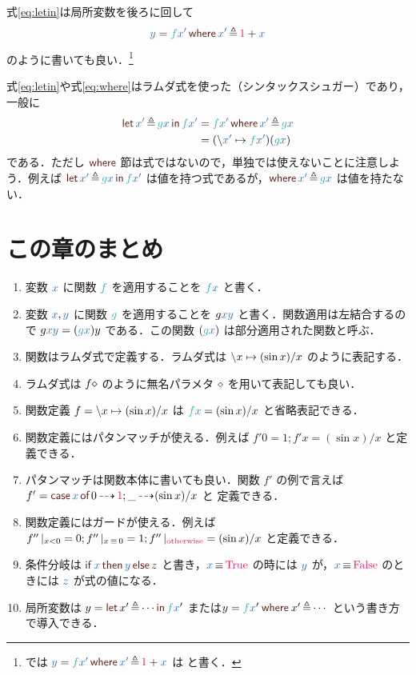\documentclass[a5paper,twoside,fleqn,draft]{jsbook}
\begin{document}
式\eqref{eq:letin}は局所変数を後ろに回して
\begin{equation}
  \label{eq:where}
  \hVar{y}
  =\hWhereSyntax{\hFunc{f}\hVar{x'}}{\hVar{x'}\hLetEq\hConstant{1}+\hVar{x}}
\end{equation}
のように書いても良い．\footnote{\haskell では $\hVar{y}=\hWhereSyntax{\hFunc{f}\hVar{x'}}{\hVar{x'}\hLetEq\hConstant{1}+\hVar{x}}$ は  と書く．}

式\eqref{eq:letin}や式\eqref{eq:where}はラムダ式を使った（シンタックスシュガー）であり，一般に
\begin{align}
  \hLetSyntax{\hVar{x'}\hLetEq\hFunc{g}\hVar{x}}{\hFunc{f}\hVar{x'}}
  &=\hWhereSyntax{\hFunc{f}\hVar{x'}}{\hVar{x'}\hLetEq\hFunc{g}\hVar{x}}\\
  &=(\hLambdaSyntax{\hVar{x'}}{\hFunc{f}\hVar{x'}})(\hFunc{g}\hVar{x})
\end{align}
である．ただし $\hWhere$ 節は式ではないので，単独では使えないことに注意しよう．例えば $\hLetSyntax{\hVar{x'}\hLetEq\hFunc{g}\hVar{x}}{\hFunc{f}\hVar{x'}}$ は値を持つ式であるが，$\hWhereSyntax{}{\hVar{x'}\hLetEq\hFunc{g}\hVar{x}}$ は値を持たない．

\section{この章のまとめ}

\begin{enumerate}
\item 変数 $\hVar{x}$ に関数 $\hFunc{f}$ を適用することを $\hFunc{f}\hVar{x}$ と書く．\item 変数 $\hVar{x},\hVar{y}$ に関数 $\hFunc{g}$ を適用することを $g\hVar{x}\hVar{y}$ と書く．関数適用は左結合するので $g\hVar{x}\hVar{y}=(\hFunc{g}\hVar{x})y$ である．この関数 $(\hFunc{g}\hVar{x})$ は部分適用された関数と呼ぶ．
\item 関数はラムダ式で定義する．ラムダ式は $\backslash x\mapsto(\sin x)/x$ のように表記する．\item ラムダ式は $f\diamond$ のように無名パラメタ $\diamond$ を用いて表記しても良い．\item 関数定義 $f=\backslash x\mapsto(\sin x)/x$ は $\hFunc{f}\hVar{x}=(\sin x)/x$ と省略表記できる．
\item 関数定義にはパタンマッチが使える．例えば $f'0=1;f'x=(\sin x)/x$ と定義できる．\item パタンマッチは関数本体に書いても良い．関数 $f'$ の例で言えば $f'=\hCaseSyntax{\hVar{x}}0\hIfSo\hConstant{1};\_\hIfSo(\sin x)/x$ と 定義できる．\item 関数定義にはガードが使える．例えば $f''\hGuard{x<0}=0;f''\hGuard{x\hIfEq0}=1;f''\hGuard{\hOtherwise}=(\sin x)/x$ と定義できる．\item 条件分岐は $\mIfThenElseEXP{\hVar{x}}{\hVar{y}}{z}$ と書き，$\hVar{x}\hIfEq\hTrue$ の時には $\hVar{y}$ が，$\hVar{x}\hIfEq\hFalse$ のときには $\hVar{z}$ が式の値になる．\item 局所変数は $y=\mLetInEXP{x'}{\dotsb}{\hFunc{f}\hVar{x}'}$ または$y=\hFunc{f}\hVar{x}'\mWhereIsEXP{x'}{\dotsb}$ という書き方で導入できる．
\end{enumerate}
\end{document}
